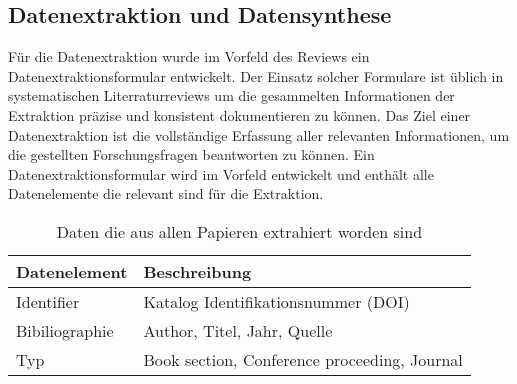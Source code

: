\subsection{Datenextraktion und Datensynthese}

Für die Datenextraktion wurde im Vorfeld des Reviews ein Datenextraktionsformular entwickelt. Der Einsatz solcher Formulare ist üblich in systematischen Literraturreviews um die gesammelten Informationen der Extraktion präzise und konsistent dokumentieren zu können. Das Ziel einer Datenextraktion ist die vollständige Erfassung aller relevanten Informationen, um die gestellten Forschungsfragen beantworten zu können. Ein Datenextraktionsformular wird im Vorfeld entwickelt und enthält alle Datenelemente die relevant sind für die Extraktion.


\begin{table}[!ht]
\renewcommand{\arraystretch}{1.3}
\centering
\begin{threeparttable}
\begin{tabularx}{\columnwidth}{@{}sX@{}}
\toprule
Datenelement & Beschreibung  \\ \midrule
Identifier & Katalog Identifikationsnummer (DOI) \\
Bibiliographie & Author, Titel, Jahr, Quelle \\
Typ & Book section, Conference proceeding, Journal \\
\bottomrule
\end{tabularx}
\medskip
\end{threeparttable}
\caption{Daten die aus allen Papieren extrahiert worden sind}
\label{tab:dataextraction_general}
\end{table}


